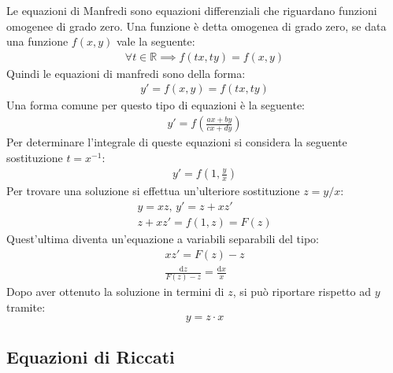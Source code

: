 \documentclass{article}
\newcommand{\df}{\mathrm{d}}
\numberwithin{equation}{subsection}
\begin{document}
Le equazioni di Manfredi sono equazioni differenziali che riguardano funzioni omogenee di grado zero. Una funzione è detta omogenea di grado zero, se data una funzione $f(x,y)$ vale la seguente:
\begin{gather*}
    \forall t\in\mathbb{R}\implies f(tx,ty)=f(x,y)    
\end{gather*}
Quindi le equazioni di manfredi sono della forma:
\begin{gather}
    y'=f(x,y)=f(tx,ty)
\end{gather}
Una forma comune per questo tipo di equazioni è la seguente:
\begin{gather*}
    y'=f\left(\frac{ax+by}{cx+dy}\right)
\end{gather*}
Per determinare l'integrale di queste equazioni si considera la seguente sostituzione $t=x^{-1}$:
\begin{gather*}
    y'=f\left(1,\displaystyle\frac{y}{x}\right)
\end{gather*}
Per trovare una soluzione si effettua un'ulteriore sostituzione $z=y/x$:
\begin{gather*}
    y=xz,\,y'=z+xz'\\
    z+xz'=f(1,z)=F(z)
\end{gather*}
Quest'ultima diventa un'equazione a variabili separabili del tipo:
\begin{gather*}
    xz'=F(z)-z\\
    \displaystyle\frac{\df z}{F(z)-z}=\frac{\df x}{x}
\end{gather*}
Dopo aver ottenuto la soluzione in termini di $z$, si può riportare rispetto ad $y$ tramite:
\begin{equation}
    y=z\cdot x
\end{equation}

\subsection{Equazioni di Riccati}
\end{document}
